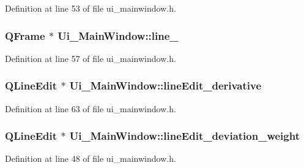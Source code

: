 Definition at line 53 of file ui\+\_\+mainwindow.\+h.

\subsubsection[{\texorpdfstring{line\+\_\+6}{line_6}}]{\setlength{\rightskip}{0pt plus 5cm}Q\+Frame $\ast$ Ui\+\_\+\+Main\+Window\+::line\+\_}\hypertarget{class_ui___main_window_ad1616ec841f70368e1cddb42ba7653d5}{}\label{class_ui___main_window_ad1616ec841f70368e1cddb42ba7653d5}


Definition at line 57 of file ui\+\_\+mainwindow.\+h.

\subsubsection[{\texorpdfstring{line\+Edit\+\_\+derivative}{lineEdit_derivative}}]{\setlength{\rightskip}{0pt plus 5cm}Q\+Line\+Edit $\ast$ Ui\+\_\+\+Main\+Window\+::line\+Edit\+\_\+derivative}\hypertarget{class_ui___main_window_aae0efe7958264dbcc58f8c308d1bf49c}{}\label{class_ui___main_window_aae0efe7958264dbcc58f8c308d1bf49c}


Definition at line 63 of file ui\+\_\+mainwindow.\+h.

\subsubsection[{\texorpdfstring{line\+Edit\+\_\+deviation\+\_\+weight}{lineEdit_deviation_weight}}]{\setlength{\rightskip}{0pt plus 5cm}Q\+Line\+Edit $\ast$ Ui\+\_\+\+Main\+Window\+::line\+Edit\+\_\+deviation\+\_\+weight}\hypertarget{class_ui___main_window_a70ba66673066720ed431921d1c7f33fb}{}\label{class_ui___main_window_a70ba66673066720ed431921d1c7f33fb}


Definition at line 48 of file ui\+\_\+mainwindow.\+h.

